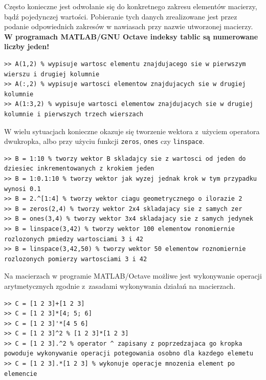 Często konieczne jest odwołanie się do konkretnego zakresu elementów macierzy, bądź pojedynczej wartości. Pobieranie tych danych zrealizowane jest przez podanie odpowiednich zakresów w nawiasach przy nazwie utworzonej macierzy. \textbf{W programach MATLAB/GNU Octave indeksy tablic są numerowane liczby jeden!}
\begin{lstlisting}[caption=Odwoływanie się do elementów macierzy , label=lab1/lst/matrixElements]
>> A(1,2) % wypisuje wartosc elementu znajdujacego sie w pierwszym wierszu i drugiej kolumnie
>> A(:,2) % wypisuje wartosci elementow znajdujacych sie w drugiej kolumnie
>> A(1:3,2) % wypisuje wartosci elementow znajdujacych sie w drugiej kolumnie i pierwszych trzech wierszach
\end{lstlisting}

W wielu sytuacjach konieczne okazuje się tworzenie wektora z~użyciem operatora dwukropka, albo przy użyciu funkcji \texttt{zeros}, \texttt{ones} czy \texttt{linspace}. 
\begin{lstlisting}[caption=Tworzenie macierzy z wykorzystaniem funkcji oraz operatora \texttt{:} , label=lab1/lst/matrixZerosOnesLinespace]
>> B = 1:10 % tworzy wektor B skladajcy sie z wartosci od jeden do dziesiec inkrementowanych z krokiem jeden
>> B = 1:0.1:10 % tworzy wektor jak wyzej jednak krok w tym przypadku wynosi 0.1
>> B = 2.^[1:4] % tworzy wektor ciagu geometrycznego o ilorazie 2
>> B = zeros(2,4) % tworzy wektor 2x4 skladajacy sie z samych zer
>> B = ones(3,4) % tworzy wektor 3x4 skladajacy sie z samych jedynek
>> B = linspace(3,42) % tworzy wektor 100 elementow ronomiernie rozlozonych pmiedzy wartosciami 3 i 42
>> B = linspace(3,42,50) % tworzy wektor 50 elementow roznomiernie rozlozonych pomierzy wartosciami 3 i 42
\end{lstlisting}

Na macierzach w programie MATLAB/Octave możliwe jest wykonywanie operacji arytmetycznych zgodnie z~zasadami wykonywania działań na macierzach.
\begin{lstlisting}[caption=Operacje arytmetyczne na macierzach , label=lab1/lst/matrixOperations]
>> C = [1 2 3]+[1 2 3]
>> C = [1 2 3]*[4; 5; 6]
>> C = [1 2 3]'*[4 5 6]
>> C = [1 2 3]^2 % [1 2 3]*[1 2 3]
>> C = [1 2 3].^2 % operator ^ zapisany z poprzedzajaca go kropka powoduje wykonywanie operacji potegowania osobno dla kazdego elemetu
>> C = [1 2 3].*[1 2 3] % wykonuje operacje mnozenia element po elemencie
\end{lstlisting}

